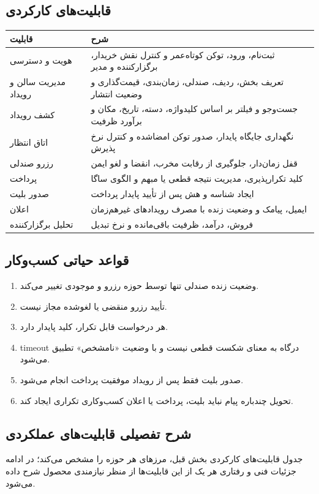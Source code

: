 \documentclass[12pt,a4paper]{article}
\newcommand{\term}[1]{\lr{#1}}
\begin{document}
\subsection{قابلیت‌های کارکردی}
\begin{longtable}{P{3.3cm}P{10.8cm}}
\toprule
قابلیت & شرح\\
\midrule
هویت و دسترسی & ثبت‌نام، ورود، توکن کوتاه‌عمر و کنترل نقش خریدار، برگزارکننده و مدیر\\
مدیریت سالن و رویداد & تعریف بخش، ردیف، صندلی، زمان‌بندی، قیمت‌گذاری و وضعیت انتشار\\
کشف رویداد & جست‌وجو و فیلتر بر اساس کلیدواژه، دسته، تاریخ، مکان و برآورد ظرفیت\\
اتاق انتظار & نگهداری جایگاه پایدار، صدور توکن امضاشده و کنترل نرخ پذیرش\\
رزرو صندلی & قفل زمان‌دار، جلوگیری از رقابت مخرب، انقضا و لغو ایمن\\
پرداخت & کلید تکرارپذیری، مدیریت نتیجه قطعی یا مبهم و الگوی ساگا\\
صدور بلیت & ایجاد شناسه و هش \term{QR} پس از تأیید پایدار پرداخت\\
اعلان & ایمیل، پیامک و وضعیت زنده با مصرف رویدادهای غیرهم‌زمان\\
تحلیل برگزارکننده & فروش، درآمد، ظرفیت باقی‌مانده و نرخ تبدیل\\
\bottomrule
\end{longtable}

\subsection{قواعد حیاتی کسب‌وکار}
\begin{enumerate}
  \item وضعیت زنده صندلی تنها توسط حوزه رزرو و موجودی تغییر می‌کند.
  \item تأیید رزرو منقضی یا لغوشده مجاز نیست.
  \item هر درخواست قابل تکرار، کلید \term{Idempotency} پایدار دارد.
  \item timeout درگاه به معنای شکست قطعی نیست و با وضعیت «نامشخص» تطبیق می‌شود.
  \item صدور بلیت فقط پس از رویداد موفقیت پرداخت انجام می‌شود.
  \item تحویل چندباره پیام نباید بلیت، پرداخت یا اعلان کسب‌وکاری تکراری ایجاد کند.
\end{enumerate}

\subsection{شرح تفصیلی قابلیت‌های عملکردی}
جدول قابلیت‌های کارکردی بخش قبل، مرزهای هر حوزه را مشخص می‌کند؛ در ادامه
جزئیات فنی و رفتاری هر یک از این قابلیت‌ها از منظر نیازمندی محصول شرح داده
می‌شود.
\end{document}
